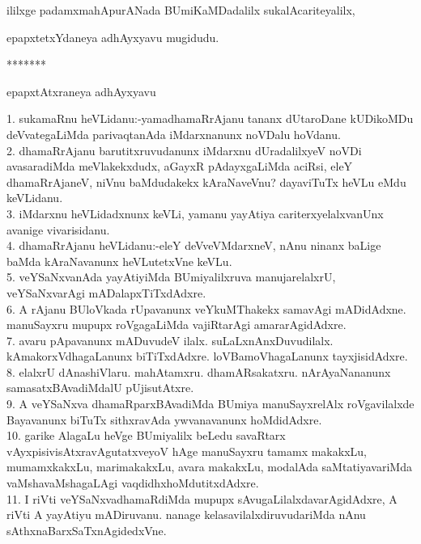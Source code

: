 \documentclass{article}
\begin{document}
\begin{center}

ililxge padamxmahApurANada BUmiKaMDadalilx sukalAcariteyalilx,
\end{center}

\begin{center}
epapxtetxYdaneya adhAyxyavu mugidudu.
\end{center}

\begin{center}
*******
\end{center}

\begin{center}
epapxtAtxraneya adhAyxyavu
\end{center}

1. sukamaRnu heVLidanu:-yamadhamaRrAjanu tananx dUtaroDane kUDikoMDu deVvategaLiMda parivaqtanAda iMdarxnanunx noVDalu hoVdanu.\\
2. dhamaRrAjanu barutitxruvudanunx iMdarxnu dUradalilxyeV noVDi avasaradiMda meVlakekxdudx, aGayxR pAdayxgaLiMda aciRsi, eleY dhamaRrAjaneV, niVnu baMdudakekx kAraNaveVnu? dayaviTuTx heVLu eMdu keVLidanu.\\
3. iMdarxnu heVLidadxnunx keVLi, yamanu yayAtiya cariterxyelalxvanUnx avanige vivarisidanu.\\
4. dhamaRrAjanu heVLidanu:-eleY deVveVMdarxneV, nAnu ninanx baLige baMda kAraNavanunx heVLutetxVne keVLu.\\
5. veYSaNxvanAda yayAtiyiMda BUmiyalilxruva manujarelalxrU, veYSaNxvarAgi mADalapxTiTxdAdxre.\\
6. A rAjanu BUloVkada rUpavanunx veYkuMThakekx samavAgi mADidAdxne. manuSayxru mupupx roVgagaLiMda vajiRtarAgi amararAgidAdxre.\\
7. avaru pApavanunx mADuvudeV ilalx. suLaLxnAnxDuvudilalx. kAmakorxVdhagaLanunx biTiTxdAdxre. loVBamoVhagaLanunx tayxjisidAdxre.\\
8. elalxrU dAnashiVlaru. mahAtamxru. dhamARsakatxru. nArAyaNananunx samasatxBAvadiMdalU pUjisutAtxre.\\
9. A veYSaNxva dhamaRparxBAvadiMda BUmiya manuSayxrelAlx roVgavilalxde Bayavanunx biTuTx sithxravAda ywvanavanunx hoMdidAdxre.\\
10. garike AlagaLu heVge BUmiyalilx beLedu savaRtarx vAyxpisivisAtxravAgutatxveyoV hAge manuSayxru tamamx makakxLu, mumamxkakxLu, marimakakxLu, avara makakxLu, modalAda saMtatiyavariMda vaMshavaMshagaLAgi vaqdidhxhoMdutitxdAdxre.\\
11. I riVti veYSaNxvadhamaRdiMda mupupx sAvugaLilalxdavarAgidAdxre, A riVti A yayAtiyu mADiruvanu. nanage kelasavilalxdiruvudariMda nAnu sAthxnaBarxSaTxnAgidedxVne.\\
\end{document}
